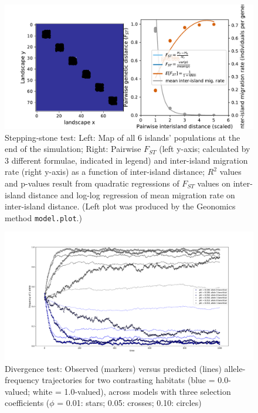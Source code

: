 ﻿\documentclass{article}
\begin{document}
\begin{figure}[ht!]
        \includegraphics[width=190mm]{./img/final/STEPPING_STONE_pop_plot_and_Fst_vs_mig_rate.pdf}
        \caption{Stepping-stone test: Left: Map of all 6 islands' populations
                 at the end of the simulation;
                 Right: Pairwise $F_{ST}$
                 (left y-axis; calculated by 3 different formulae, indicated in legend)
                 and inter-island migration rate (right y-axis)
                 as a function of inter-island distance;
                 $R^{2}$ values and p-values result from quadratic regressions
                 of $F_{ST}$ values on inter-island distance and
                 log-log regression of mean migration rate on inter-island distance.
                 (Left plot was produced by the Geonomics method
                 \texttt{model.plot}.)}
        \label{fig:stepstone_pop_and_Fst_mig_expecs}
\end{figure}


\begin{figure}[ht!]
        \includegraphics[width=175mm]{./img/final/DIVERGENCE_allele_freqs.pdf}
        \caption{Divergence test: Observed (markers) versus predicted (lines)
                 allele-frequency trajectories for two contrasting habitats
                 (blue = 0.0-valued; white = 1.0-valued),
                 across models with three selection coefficients
                 ($\phi$ = 0.01: stars; 0.05: crosses; 0.10: circles)}
        \label{fig:div_freqs}
\end{figure}
\end{document}
